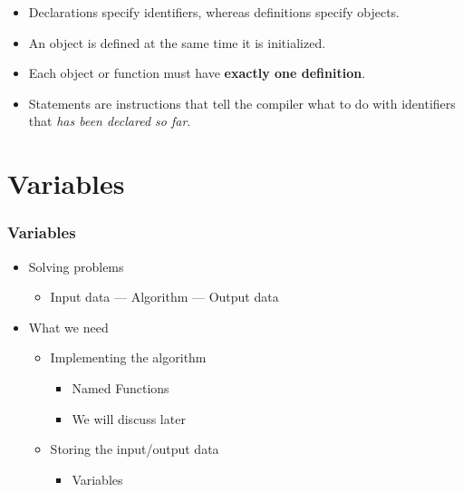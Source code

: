 \documentclass{../c-lecture}
\begin{document}
\begin{frame}
  \begin{itemize}
    \item Declarations specify identifiers, whereas definitions specify objects.
    \item An object is defined at the same time it is initialized.
    \item Each object or function must have \textbf{\color{Cyan} exactly one definition}.
  \end{itemize}
\end{frame}

\begin{frame}
  \begin{itemize}
    \item Statements are instructions that tell the compiler what to do with identifiers that \textit{\color{Peach} has been declared so far}.
  \end{itemize}
\end{frame}

\section{Variables}

\begin{frame}
  \frametitle{Variables}
  \begin{itemize}
    \item Solving problems
    \begin{itemize}
      \item Input data --- Algorithm --- Output data
    \end{itemize}
    \item What we need
    \begin{itemize}
      \item Implementing the algorithm
      \begin{itemize}
        \item Named {\color{Orange} Functions}
        \item We will discuss later
      \end{itemize}
      \item Storing the input/output data
      \begin{itemize}
        \item {\color{Orange} Variables}
      \end{itemize}
    \end{itemize}
  \end{itemize}
\end{frame}
\end{document}
